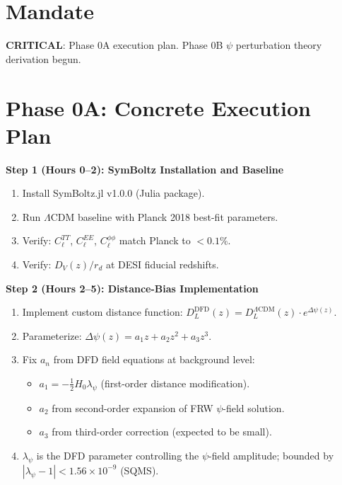 \documentclass[11pt,a4paper]{article}
\begin{document}
\section{Mandate}

\textbf{CRITICAL}: Phase 0A execution plan. Phase 0B $\psi$ perturbation theory derivation begun.

\section{Phase 0A: Concrete Execution Plan}

\begin{tcolorbox}[colback=green!5!white, colframe=green!60!black,
  title={Phase 0A: 12-Hour Background-Only Computation --- Detailed Plan}]

\textbf{Step 1 (Hours 0--2): SymBoltz Installation and Baseline}
\begin{enumerate}
\item Install SymBoltz.jl v1.0.0 (Julia package).
\item Run $\Lambda$CDM baseline with Planck 2018 best-fit parameters.
\item Verify: $C_\ell^{TT}$, $C_\ell^{EE}$, $C_\ell^{\phi\phi}$ match Planck to $< 0.1\%$.
\item Verify: $D_V(z)/r_d$ at DESI fiducial redshifts.
\end{enumerate}

\textbf{Step 2 (Hours 2--5): Distance-Bias Implementation}
\begin{enumerate}
\item Implement custom distance function: $D_L^{\text{DFD}}(z) = D_L^{\Lambda\text{CDM}}(z) \cdot e^{\Delta\psi(z)}$.
\item Parameterize: $\Delta\psi(z) = a_1 z + a_2 z^2 + a_3 z^3$.
\item Fix $a_n$ from DFD field equations at background level:
\begin{itemize}
\item $a_1 = -\frac{1}{2} H_0 \lambda_\psi$ (first-order distance modification).
\item $a_2$ from second-order expansion of FRW $\psi$-field solution.
\item $a_3$ from third-order correction (expected to be small).
\end{itemize}
\item $\lambda_\psi$ is the DFD parameter controlling the $\psi$-field amplitude; bounded by $|\lambda_\psi - 1| < 1.56 \times 10^{-9}$ (SQMS).
\end{enumerate}


\end{tcolorbox}
\end{document}
